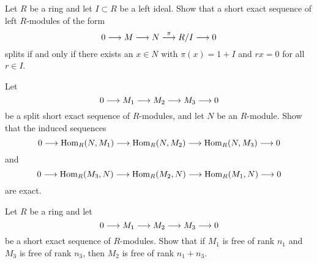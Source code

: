 \begin{exercise}
Let $R$ be a ring and let $I\subset R$ be a left ideal. Show that a short exact sequence
of left $R$-modules of the form
\[
	0 \longrightarrow M \longrightarrow N \overset{\pi}{\longrightarrow} R/I \longrightarrow 0
\]
splits if and only if there exists an $x\in N$ with $\pi(x)=1+I$ and $rx=0$ for all $r\in I$.
\end{exercise}



\begin{exercise}\label{exc:hom-of-split-exact-seq}
Let
\[
	0\longrightarrow M_1 \longrightarrow M_2 \longrightarrow M_3 \longrightarrow 0
\]
be a split short exact sequence of $R$-modules, and let $N$ be an $R$-module. Show that the induced sequences
\[
	0 \longrightarrow \operatorname{Hom}_R(N,M_1) \longrightarrow \operatorname{Hom}_R(N,M_2) \longrightarrow \operatorname{Hom}_R(N,M_3) \longrightarrow 0
\]
and
\[
	0 \longrightarrow \operatorname{Hom}_R(M_3,N) \longrightarrow \operatorname{Hom}_R(M_2,N) \longrightarrow \operatorname{Hom}_R(M_1,N) \longrightarrow 0
\]
are exact.
\end{exercise}


\begin{exercise}
Let $R$ be a ring and let 
\[
	0 \longrightarrow M_1 \longrightarrow M_2 \longrightarrow M_3 \longrightarrow 0
\]
be a short exact sequence of $R$-modules. Show that if $M_1$ is free of rank $n_1$ and $M_3$ is free of rank $n_3$, then $M_2$ is free of rank $n_1+n_3$.
\end{exercise}
%
%


